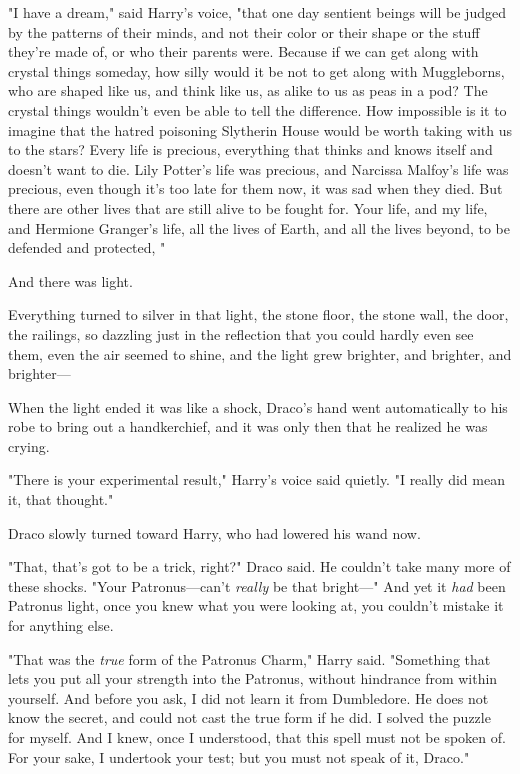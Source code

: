"I have a dream," said Harry's voice, "that one day sentient beings will be
judged by the patterns of their minds, and not their color or their shape or
the stuff they're made of, or who their parents were. Because if we can get
along with crystal things someday, how silly would it be not to get along with
Muggleborns, who are shaped like us, and think like us, as alike to us as peas
in a pod? The crystal things wouldn't even be able to tell the difference. How
impossible is it to imagine that the hatred poisoning Slytherin House would be
worth taking with us to the stars? Every life is precious, everything that
thinks and knows itself and doesn't want to die. Lily Potter's life was
precious, and Narcissa Malfoy's life was precious, even though it's too late
for them now, it was sad when they died. But there are other lives that are
still alive to be fought for. Your life, and my life, and Hermione Granger's
life, all the lives of Earth, and all the lives beyond, to be defended and
protected, \emph{}"

And there was light.

Everything turned to silver in that light, the stone floor, the stone wall, the
door, the railings, so dazzling just in the reflection that you could hardly
even see them, even the air seemed to shine, and the light grew brighter, and
brighter, and brighter---

When the light ended it was like a shock, Draco's hand went automatically to
his robe to bring out a handkerchief, and it was only then that he realized he
was crying.

"There is your experimental result," Harry's voice said quietly. "I really did
mean it, that thought."

Draco slowly turned toward Harry, who had lowered his wand now.

"That, that's got to be a trick, right?" Draco said. He couldn't take many more
of these shocks. "Your Patronus---can't \emph{really} be that bright\mbox{---}" And
yet it \emph{had} been Patronus light, once you knew what you were looking at,
you couldn't mistake it for anything else.

"That was the \emph{true} form of the Patronus Charm," Harry said. "Something
that lets you put all your strength into the Patronus, without hindrance from
within yourself. And before you ask, I did not learn it from Dumbledore. He
does not know the secret, and could not cast the true form if he did. I solved
the puzzle for myself. And I knew, once I understood, that this spell must not
be spoken of. For your sake, I undertook your test; but you must not speak of
it, Draco."

